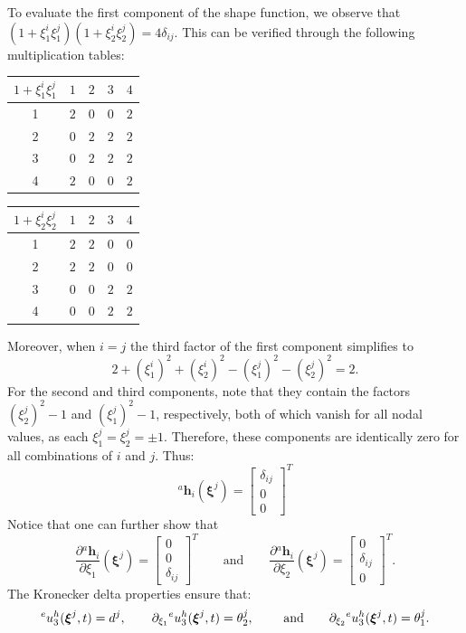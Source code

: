 \documentclass[12pt]{article}
\begin{document}
To evaluate the first component of the shape function, we observe that $(1 + \xi_1^i \xi_1^j)(1 + \xi_2^i \xi_2^j)=4\delta_{ij}$. This can be verified through the following multiplication tables:
\begin{center}
    \begin{tabular}{c|cccc}
        $1+\xi_1^i\xi_1^j$ & $1$ & $2$ & $3$ & $4$ \\\hline
        1                  & $2$ & $0$ & $0$ & $2$ \\
        2                  & $0$ & $2$ & $2$ & $2$ \\
        3                  & $0$ & $2$ & $2$ & $2$ \\
        4                  & $2$ & $0$ & $0$ & $2$ \\
    \end{tabular}\qquad
    \begin{tabular}{c|cccc}
        $1+\xi_2^i\xi_2^j$ & $1$ & $2$ & $3$ & $4$ \\\hline
        1                  & $2$ & $2$ & $0$ & $0$ \\
        2                  & $2$ & $2$ & $0$ & $0$ \\
        3                  & $0$ & $0$ & $2$ & $2$ \\
        4                  & $0$ & $0$ & $2$ & $2$ \\
    \end{tabular}
\end{center}
Moreover, when $i=j$ the third factor of the first component simplifies to
$$2 + (\xi_1^i)^2 + (\xi_2^i)^2 - (\xi_1^j)^2 - (\xi_2^j)^2=2.$$
For the second and third components, note that they contain the factors $(\xi_2^j)^2 - 1$ and $(\xi_1^j)^2 - 1$, respectively, both of which vanish for all nodal values, as each $\xi_1^j=\xi_2^j = \pm1$. Therefore, these components are identically zero for all combinations of $i$ and $j$. Thus:
\[
    {}^a\mathbf{h}_i(\boldsymbol{\xi}^j) = \begin{bmatrix} \delta_{ij} \\ 0 \\ 0 \end{bmatrix}^T
\]
Notice that one can further show that
\[
    \frac{\partial{}^a\mathbf{h}_i}{\partial \xi_1}(\boldsymbol{\xi}^j) = \begin{bmatrix} 0\\ 0 \\ \delta_{ij}  \end{bmatrix}^T\qquad\text{and}\qquad\frac{\partial{}^a\mathbf{h}_i}{\partial \xi_2}(\boldsymbol{\xi}^j) = \begin{bmatrix} 0 \\ \delta_{ij} \\ 0 \end{bmatrix}^T.
\]
The Kronecker delta properties ensure that:
$${}^eu_3^h (\boldsymbol\xi^j,t)=d^j,\qquad \partial_{\xi_1}{}^eu_3^h (\boldsymbol\xi^j,t)=\theta_2^j,\qquad \text{ and} \qquad \partial_{\xi_2}{}^eu_3^h (\boldsymbol\xi^j,t)=\theta_1^j.$$
\end{document}
